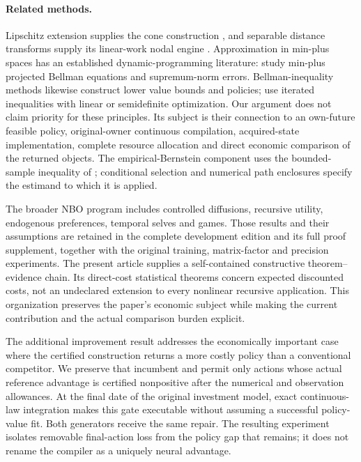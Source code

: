\documentclass[ecta,nameyear,draft]{econsocart}
\begin{document}
\paragraph{Related methods.}
Lipschitz extension supplies the cone construction \citep{mcshane1934}, and separable distance transforms supply its linear-work nodal engine \citep{felzenszwalb2012}. Approximation in min-plus spaces has an established dynamic-programming literature: \citet{lakshminarayanan2014} study min-plus projected Bellman equations and supremum-norm errors. Bellman-inequality methods likewise construct lower value bounds and policies; \citet{wang2015} use iterated inequalities with linear or semidefinite optimization. Our argument does not claim priority for these principles. Its subject is their connection to an own-future feasible policy, original-owner continuous compilation, acquired-state implementation, complete resource allocation and direct economic comparison of the returned objects. The empirical-Bernstein component uses the bounded-sample inequality of \citet{maurer2009}; conditional selection and numerical path enclosures specify the estimand to which it is applied.

The broader NBO program includes controlled diffusions, recursive utility, endogenous preferences, temporal selves and games. Those results and their assumptions are retained in the complete development edition and its full proof supplement, together with the original training, matrix-factor and precision experiments. The present article supplies a self-contained constructive theorem--evidence chain. Its direct-cost statistical theorems concern expected discounted costs, not an undeclared extension to every nonlinear recursive application. This organization preserves the paper's economic subject while making the current contribution and the actual comparison burden explicit.

The additional improvement result addresses the economically important case where the certified construction returns a more costly policy than a conventional competitor. We preserve that incumbent and permit only actions whose actual reference advantage is certified nonpositive after the numerical and observation allowances. At the final date of the original investment model, exact continuous-law integration makes this gate executable without assuming a successful policy-value fit. Both generators receive the same repair. The resulting experiment isolates removable final-action loss from the policy gap that remains; it does not rename the compiler as a uniquely neural advantage.
\end{document}
